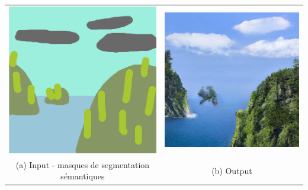 \documentclass[a4paper, 12pt]{report}
\begin{document}
\begin{center}
  \centering
  \begin{tabular}{cc}
    \includegraphics[height=0.15\textheight]{images/test-gaugan-sm.jpg}&
    \includegraphics[height=0.15\textheight]{images/test-gaugan.jpg}\\
    (a) Input - masques de segmentation sémantiques &(b) Output
  \end{tabular}
\end{center}
\end{document}
